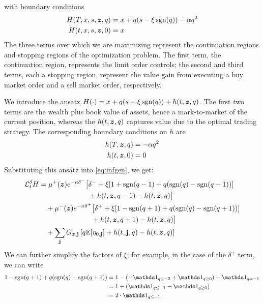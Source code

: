 with boundary conditions
\begin{align}
H(T, x, s, \bm{z}, q) & = x + q(s - \xi \operatorname{\mathrm{sgn}} (q)) - \alpha q^2 \\
H(t, x, s, \bm{z}, 0) & = x
\end{align}
The three terms over which we are maximizing represent the continuation regions and stopping regions of the optimization problem. The first term, the continuation region, represents the limit order controls; the second and third terms, each a stopping region, represent the value gain from executing a buy market order and a sell market order, respectively.

We introduce the ansatz $H(\cdot) = x + q(s - \xi \operatorname{\mathrm{sgn}}(q)) + h(t,\bm{z},q)$. The first two terms are the wealth plus book value of assets, hence a mark-to-market of the current position, whereas the $h(t,\bm{z},q)$ captures value due to the optimal trading strategy. The corresponding boundary conditions on $h$ are
\begin{align}
h(T, \bm{z}, q) & = - \alpha q^2 \\
h(t, \bm{z}, 0) & = 0
\end{align}
Substituting this ansatz into \autoref{eq:infgen}, we get:
\begin{equation}
\begin{split}
\cL^{\delta}_t H & = \mu^+(\bz) e^{ -\kappa \delta^{-}} \bigl[ \delta^- + \xi [ 1 + \mathrm{sgn}(q-1) + q(\mathrm{sgn}(q) - \mathrm{sgn}(q-1) ) ] \\
& \hphantom{ {}={} \mu^+(\bz) e^{ -\kappa \delta^{-}} \bigl[ } + h(t,\bz,q-1) - h(t,\bz,q) \bigr] \\
& \quad + \mu^-(\bz) e^{ -\kappa \delta^{+}} \bigl[ \delta^+ + \xi [ 1 - \mathrm{sgn}(q+1) + q(\mathrm{sgn}(q) - \mathrm{sgn}(q+1) ) ] \\
& \hphantom{\quad + \mu^-(\bz) e^{ -\kappa \delta^{+}} \bigl[} + h(t,\bz,q+1) - h(t,\bz,q) \bigr] \\
& \quad + \sum_{\bj} G_{\bz,\bj} \left[q \E [\eta_{0,\bj}] +h(t,\bj,q) - h(t,\bz, q) \right]
\end{split}
\end{equation}
We can further simplify the factors of $\xi$; for example, in the case of the $\delta^+$ term, we can write
\begin{align*}
1 - \mathrm{sgn}(q+1) + q(\mathrm{sgn}(q) - \mathrm{sgn}(q+1) )  & = 
1 - (- \indicator_{q \leq -2} + \indicator_{q \geq 0}) +  \indicator_{q = -1} \\
& = 1 + ( \indicator_{q \leq -1} -  \indicator_{q \geq 0} )\\
& = 2 \cdot \indicator_{q \leq -1}
\end{align*}
